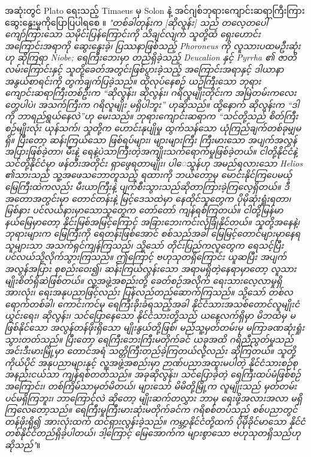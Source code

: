 \documentclass[10pt,twocolumn,letterpaper]{article}
\begin{document}
အဆုံးတွင် Plato ရေးသည့် Timaeus မှ Solon နဲ့ အင်ဂျစ်ဘုရားကျောင်းဆရာကြီးကြား ဆွေးနွေးမှုကိုပြောပြပါရစေ \cite{140}။ \textit{"တစ်ခါတုန်းက [ဆိုလွန်း] သည် တလေ့တပေါ် ကျော်ကြားသော သမိုင်းပြန်ကြောင်းကို သိချင်လျက် သူတို့ထံ ရှေးဟောင်းအကြောင်းအရာကို ဆွေးနွေးခဲ့၊ ပြဿနာဖြစ်သည့် Phoroneus ကို လူသားပထမဦးဆုံးဟု ဆိုကြရာ Niobe; ရေကြီးဘေးမှာ တည်ရှိခဲ့သည့် Deucalion နှင့် Pyrrha ၏ ဇာတိလမ်းကြောင်းနှင့် သူတို့ခေတ်အတွင်းဖြစ်ပွားခဲ့သည့် အကြောင်းအရာနှင့် ဒါယာနာအနွယ်စာရင်းကို တွက်ချက်ပြခဲ့သည်။ ထိုလုပ်နေစဉ် ယဉ်ကြီးသော ဘုရားကျောင်းဆရာကြီးတစ်ဦးက “ဆိုလွန်း၊ ဆိုလွန်း၊ ဂရိလူမျိုးတိုင်းက အမြဲတမ်းကလေးတွေပါပဲ၊ အသက်ကြီးက ဂရိလူမျိုး မရှိပါဘူး” ဟုဆိုသည်။ ထို့နောက် ဆိုလွန်းက “ဒါကို ဘာရည်ရွယ်နေလဲ”ဟု မေးသည်။ ဘုရားကျောင်းဆရာက “သင်တို့သည် စိတ်ကြီးစဉ်မျိုးလုံး ယုန်သက်၊ သူတို့က ဟောင်းနုပျိုမှု ထွက်သန်သော ယုံကြည်ချက်တစ်ခုမျှမရှိ။ ပြီးတော့ ဆန်းကြယ်သော ဖြစ်ရပ်များ၊ များများကြီး ကြီးမားသော အပျက်အလွန်အပြားဖြစ်ခဲ့တာ၊ မီးနဲ့ ရေနဲ့ပဲသာကြီးတဲ့အကျိုးသက်ရောက်မှုဖြစ်ခဲ့တယ်။ ငါတို့နိုင်ငံနဲ့ သင်တို့နိုင်ငံမှာ ဖန်တီးအတိုင်း ရှာဖွေရတာမျိုး၊ ပါေသွန်ဟု အမည်ရလားသော Helios ၏သားသည် သူ့အဖေသဘောတူသည့် ရထားကို ဘယ်တော့မှ မောင်းနိုင်ကြပေမယ့် မြေကြီးထဲကလည်း မီးယာကြီးနဲ့ ပျက်စီးသွားသည်ဆိုတာကြားခဲ့ကြလေ့ရှိတယ်။ ဒီအတောအတွင်းမှာ တောင်တန်းနဲ့ မြင့်ဒေသထဲမှာ နေထိုင်သူတွေက ပိုမိုဆုံးရှုံးရတာ၊ မြစ်နား ပင်လယ်နားမှာသောသူတွေက တော်တော် ကျန်ရစ်ကြတယ်။ ငါတို့မြန်မာနယ်မြေမှာတော့ နိုင်းမြစ်အမြင့်ကြောင့် အခြားဘေးကင်းလုံခြုံနိုင်တယ်။ သူတို့အနေနဲ့၊ ဘုရားများက မြေကြီးကို ရေတန်းဖြစ်အောင် စစ်သည်အခါ မြေမြင့်တောင်များမှာနေရသူများသာ အသက်ရှင်ကျန်ကြသည်၊ သို့သော် တိုင်းပြည်ကလူတွေက ရေသင့်ပြီး ပင်လယ်သို့လိုက်သွားကြသည်။ ဤကြောင့် ဗဟုသုတရှိကြောင်း ယူဆပြီး အပျက်အလွန်အပြား စုစည်းဝေး၍၊ ဆန်းကြယ်လွန်းသော အရာမရှိတဲ့နေရာမှာတော့ လူသားမျိုးစိတ်ရှိဆဲဖြစ်တယ်။  လူ့အဖွဲ့အစည်းတို့ ခေတ်စဉ်အလိုက် ရေးသားလေ့လာမှုရှိအားလုံး၊ ရေးအနုပညာဖြင့်လည်း ပြန်လည်တည်ဆောက်ကြသည်။ သို့သော် တစ်လရောက်တစ်ခါ၊ ကောင်းကင်မှ ရေကြီးခိုးခံရသည့်အခါ နိုင်ငံသားအသစ်တောင်လူမျိုးငံယွင်းရေး၊ ဆိုလွန်း၊ သင်ပြောနေသော နိုင်ငံသားတို့သည် ယနေ့လက်ရှိမှာ မိဘထံမှ မဖြစ်နိုင်သော အလွန်တန်ဖိုးရှိသော မျိုးနွယ်တို့ဖြစ်၊ မည်သူ့မှတ်တမ်းမှ မကြာခဏဆုံးရှုံးသွားတတ်သည်။ ပြီးတော့ ရေကြီးဘေးကြီးမတိုက်ခင် ယခုအထိ ဂရိညီညွတ်မှုသည် အင်းဒီးမားမြို့မှာ တောင်အရံ သတ္တိကြီးတည်ခဲ့ကြတယ်လို့လည်း ဆိုကြတယ်။ သူတို့ကိုယ်ပိုင် အနုပညာများနှင့် လူ့အဖွဲ့အစည်းမှာ ဉာဏ်ပညာအထူးမပါတဲ့ နိုင်ငံသားစဉ်စုအနည်းငယ်သာ ကျန်ရစ်တတ်သည်။  အခုဆိုလွန်း၊ သင်ပြောခဲ့တဲ့ ရေကြီးထပ်မံဖြစ်စဉ်အကြောင်း၊ တစ်ကြိမ်သာမှတ်မိတယ်၊ များသော် မိမိတို့မြို့က လူမျိုးသည် မှတ်တမ်းပင်မရှိကြဘူး၊ ဘာကြောင့်လဲ ဆိုတော့ မျိုးဆက်တလွှား ဘာမှ ရေးဖို့အလားအလာ မရှိကြလေတော့သည်။ ရေကြီးမှုကြီးမားဆုံးမတိုက်ခင်က ဂရိစစ်တပ်သည် စစ်ပညာတွင် တန်ဖိုးရှိ၍ အားလုံးထက် ထင်ရှားလွန်းခဲ့သည်။ ကမ္ဘာ့နိုင်ငံတို့ထက် ပိုမိုခိုင်မာသော နိုင်ငံတစ်နိုင်ငံတည်ရှိခဲ့ပါတယ်၊ ဒါ့ကြောင့် မြေအောက်က များစွာသော ဗဟုသုတရှိသည်ဟု ဆိုသည်"}။
\end{document}
